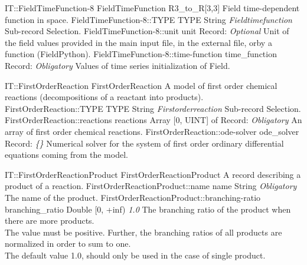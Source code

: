 \begin{RecordType}
	{IT::FieldTimeFunction-8}
	{FieldTimeFunction}
	{} %
	{} %
	{{{R3{\_}to{\_}R[3,3] Field time-dependent function in space.}}}
		\RecKey
			{FieldTimeFunction-8::TYPE}
			{TYPE}
			{{String}}
			{ \it{Fieldtimefunction} }
			{{{Sub-record Selection.}}}
		\RecKey
			{FieldTimeFunction-8::unit}
			{unit}
			{{Record}{: }}
			{ \it{Optional} }
			{{{Unit of the field values provided in the main input file, in the external file, orby a function (FieldPython).}}}
		\RecKey
			{FieldTimeFunction-8::time-function}
			{time{\_}function}
			{{Record}{: }}
			{ \it{Obligatory} }
			{{{Values of time series initialization of Field.}}}
\end{RecordType}
\begin{RecordType}
	{IT::FirstOrderReaction}
	{FirstOrderReaction}
	{} %
	{} %
	{{{A model of first order chemical reactions (decompositions of a reactant into products).}}}
		\RecKey
			{FirstOrderReaction::TYPE}
			{TYPE}
			{{String}}
			{ \it{Firstorderreaction} }
			{{{Sub-record Selection.}}}
		\RecKey
			{FirstOrderReaction::reactions}
			{reactions}
			{{Array [0, UINT] of }{Record}{: }}
			{ \it{Obligatory} }
			{{{An array of first order chemical reactions.}}}
		\RecKey
			{FirstOrderReaction::ode-solver}
			{ode{\_}solver}
			{{Record}{: }}
			{ \it{{\{}{\}}} }
			{{{Numerical solver for the system of first order ordinary differential equations coming from the model.}}}
\end{RecordType}
\begin{RecordType}
	{IT::FirstOrderReactionProduct}
	{FirstOrderReactionProduct}
	{} %
	{} %
	{{{A record describing a product of a reaction.}}}
		\RecKey
			{FirstOrderReactionProduct::name}
			{name}
			{{String}}
			{ \it{Obligatory} }
			{{{The name of the product.}}}
		\RecKey
			{FirstOrderReactionProduct::branching-ratio}
			{branching{\_}ratio}
			{{Double [0, +inf)}}
			{ \it{1.0} }
			{{{The branching ratio of the product when there are more products.}\\{
The value must be positive. Further, the branching ratios of all products are normalized in order to sum to one.}\\{
The default value 1.0, should only be used in the case of single product.}}}
\end{RecordType}
